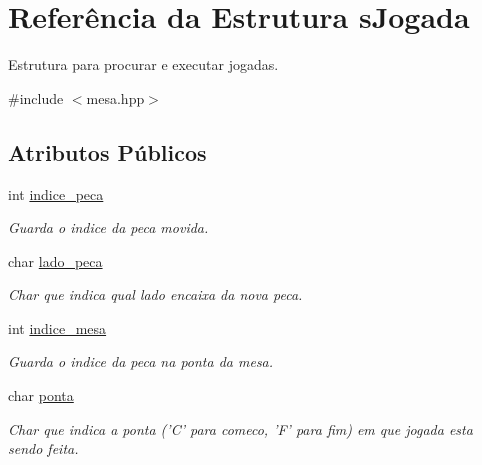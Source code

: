 \hypertarget{structsJogada}{
\section{Referência da Estrutura sJogada}
\label{structsJogada}
}


Estrutura para procurar e executar jogadas.  




{\ttfamily \#include $<$mesa.hpp$>$}

\subsection*{Atributos Públicos}
\begin{DoxyCompactItemize}
\item 
\hypertarget{structsJogada_a4d4f6b668fe49e4549d4706966a86c05}{
int \hyperlink{structsJogada_a4d4f6b668fe49e4549d4706966a86c05}{indice\_\-peca}}
\label{structsJogada_a4d4f6b668fe49e4549d4706966a86c05}

\begin{DoxyCompactList}\small\item\em Guarda o indice da peca movida. \item\end{DoxyCompactList}\item 
\hypertarget{structsJogada_a800ff28211e3d6c2247539f4a9017767}{
char \hyperlink{structsJogada_a800ff28211e3d6c2247539f4a9017767}{lado\_\-peca}}
\label{structsJogada_a800ff28211e3d6c2247539f4a9017767}

\begin{DoxyCompactList}\small\item\em Char que indica qual lado encaixa da nova peca. \item\end{DoxyCompactList}\item 
\hypertarget{structsJogada_a13134fc4a30976d3598673ba6f37a733}{
int \hyperlink{structsJogada_a13134fc4a30976d3598673ba6f37a733}{indice\_\-mesa}}
\label{structsJogada_a13134fc4a30976d3598673ba6f37a733}

\begin{DoxyCompactList}\small\item\em Guarda o indice da peca na ponta da mesa. \item\end{DoxyCompactList}\item 
\hypertarget{structsJogada_aeb268368bd8aee87d3ee84b50790b971}{
char \hyperlink{structsJogada_aeb268368bd8aee87d3ee84b50790b971}{ponta}}
\label{structsJogada_aeb268368bd8aee87d3ee84b50790b971}

\begin{DoxyCompactList}\small\item\em Char que indica a ponta ('C' para comeco, 'F' para fim) em que jogada esta sendo feita. \item\end{DoxyCompactList}\end{DoxyCompactItemize}



